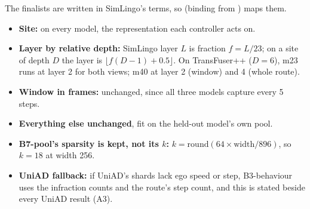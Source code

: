 The finalists are written in SimLingo's terms, so 
(binding from ) maps them.
\begin{itemize}
  \item \textbf{Site:}  on every model, the representation
        each controller acts on.
  \item \textbf{Layer by relative depth:} SimLingo layer $L$ is fraction
        $f = L/23$; on a site of depth $D$ the layer is
        $\lfloor f(D-1) + 0.5 \rfloor$. On TransFuser++ ($D=6$), m23 runs at
        layer 2 for both views; m40 at layer 2 (window) and 4 (whole route).
  \item \textbf{Window in frames:} unchanged, since all three models capture
        every 5 steps.
  \item \textbf{Everything else unchanged}, fit on the held-out model's own pool.
  \item \textbf{B7-pool's sparsity is kept, not its $k$:} $k = \text{round}(64
        \times \text{width} / 896)$, so $k=18$ at width 256.
  \item \textbf{UniAD fallback:} if UniAD's shards lack ego speed or step,
        B3-behaviour uses the infraction counts and the route's step count, and
        this is stated beside every UniAD result (A3).
\end{itemize}
